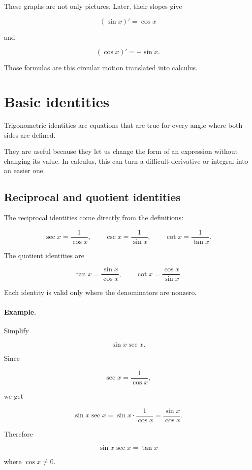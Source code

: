 These graphs are not only pictures.  Later, their slopes give

\[
(\sin x)'=\cos x
\]

and

\[
(\cos x)'=-\sin x.
\]

Those formulas are this circular motion translated into calculus.

\section{Basic identities}
\label{appsec:basic-trig-identities}

Trigonometric identities are equations that are true for every angle where both sides
are defined.

They are useful because they let us change the form of an expression without changing
its value.  In calculus, this can turn a difficult derivative or integral into an easier one.

\subsection{Reciprocal and quotient identities}
\label{appsubsec:reciprocal-quotient-identities}

The reciprocal identities come directly from the definitions:

\[
\boxed{
\sec x=\frac1{\cos x},
\qquad
\csc x=\frac1{\sin x},
\qquad
\cot x=\frac1{\tan x}.
}
\]

The quotient identities are

\[
\boxed{
\tan x=\frac{\sin x}{\cos x},
\qquad
\cot x=\frac{\cos x}{\sin x}.
}
\]

Each identity is valid only where the denominators are nonzero.

\paragraph{Example.}
Simplify

\[
\sin x\sec x.
\]

Since

\[
\sec x=\frac1{\cos x},
\]

we get

\[
\sin x\sec x
=
\sin x\cdot\frac1{\cos x}
=
\frac{\sin x}{\cos x}.
\]

Therefore

\[
\boxed{
\sin x\sec x=\tan x
}
\]

where \(\cos x\neq0\).

